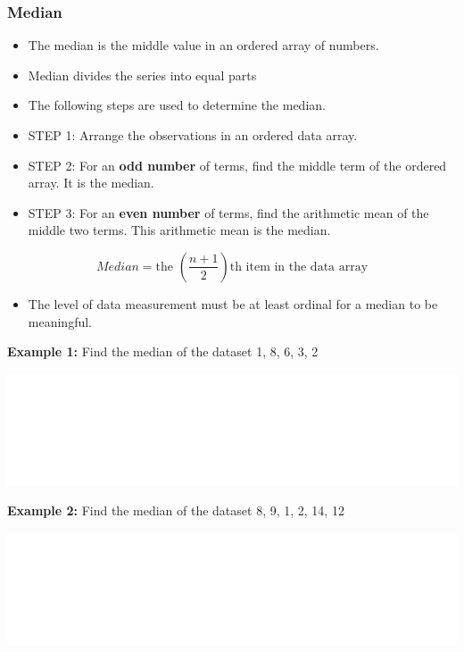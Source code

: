 \documentclass[]{book}
\providecommand{\tightlist}{%
  \setlength{\itemsep}{0pt}\setlength{\parskip}{0pt}}
\begin{document}
\hypertarget{median}{%
\subsubsection{Median}\label{median}}

\begin{itemize}
\item
  The median is the middle value in an ordered array of numbers.
\item
  Median divides the series into equal parts
\item
  The following steps are used to determine the median.
\item
  STEP 1: Arrange the observations in an ordered data array.
\item
  STEP 2: For an \textbf{odd number} of terms, find the middle term of the ordered array. It is the median.
\item
  STEP 3: For an \textbf{even number} of terms, find the arithmetic mean of the middle two terms. This arithmetic mean is the median.
\end{itemize}

\[Median = \text{the }(\frac{n+1}{2})\text{th item in the data array} \]

\begin{itemize}
\tightlist
\item
  The level of data measurement must be at least ordinal for a median to be meaningful.
\end{itemize}

\textbf{Example 1:} Find the median of the dataset 1, 8, 6, 3, 2

\begin{center}\includegraphics[width=1\linewidth]{figure/median1-1} \end{center}

\textbf{Example 2:} Find the median of the dataset 8, 9, 1, 2, 14, 12

\begin{center}\includegraphics[width=1\linewidth]{figure/median2-1} \end{center}
\end{document}
